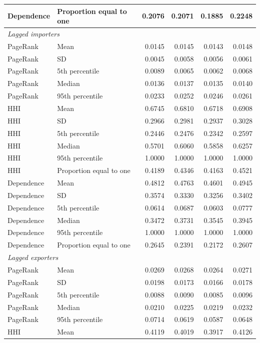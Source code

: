 \documentclass[pdftex,12pt,openright,a4paper,oneside]{book}
\begin{document}
\begin{longtable}{llrrrr}
Dependence & Proportion equal to one & 0.2076 & 0.2071 & 0.1885 & 0.2248 \\
\midrule
\multicolumn{6}{l}{\textit{Lagged importers}}\\
\midrule
PageRank & Mean & 0.0145 & 0.0145 & 0.0143 & 0.0148 \\
PageRank & SD & 0.0045 & 0.0058 & 0.0056 & 0.0061 \\
PageRank & 5th percentile & 0.0089 & 0.0065 & 0.0062 & 0.0068 \\
PageRank & Median & 0.0136 & 0.0137 & 0.0135 & 0.0140 \\
PageRank & 95th percentile & 0.0233 & 0.0252 & 0.0246 & 0.0261 \\
\addlinespace[2pt]
HHI & Mean & 0.6745 & 0.6810 & 0.6718 & 0.6908 \\
HHI & SD & 0.2966 & 0.2981 & 0.2937 & 0.3028 \\
HHI & 5th percentile & 0.2446 & 0.2476 & 0.2342 & 0.2597 \\
HHI & Median & 0.5701 & 0.6060 & 0.5858 & 0.6257 \\
HHI & 95th percentile & 1.0000 & 1.0000 & 1.0000 & 1.0000 \\
HHI & Proportion equal to one & 0.4189 & 0.4346 & 0.4163 & 0.4521 \\
\addlinespace[2pt]
Dependence & Mean & 0.4812 & 0.4763 & 0.4601 & 0.4945 \\
Dependence & SD & 0.3574 & 0.3330 & 0.3256 & 0.3402 \\
Dependence & 5th percentile & 0.0614 & 0.0687 & 0.0603 & 0.0777 \\
Dependence & Median & 0.3472 & 0.3731 & 0.3545 & 0.3945 \\
Dependence & 95th percentile & 1.0000 & 1.0000 & 1.0000 & 1.0000 \\
Dependence & Proportion equal to one & 0.2645 & 0.2391 & 0.2172 & 0.2607 \\
\midrule
\multicolumn{6}{l}{\textit{Lagged exporters}}\\
\midrule
PageRank & Mean & 0.0269 & 0.0268 & 0.0264 & 0.0271 \\
PageRank & SD & 0.0198 & 0.0173 & 0.0166 & 0.0178 \\
PageRank & 5th percentile & 0.0088 & 0.0090 & 0.0085 & 0.0096 \\
PageRank & Median & 0.0210 & 0.0225 & 0.0219 & 0.0232 \\
PageRank & 95th percentile & 0.0714 & 0.0619 & 0.0587 & 0.0648 \\
\addlinespace[2pt]
HHI & Mean & 0.4119 & 0.4019 & 0.3917 & 0.4126 \\

\end{longtable}
\end{document}
